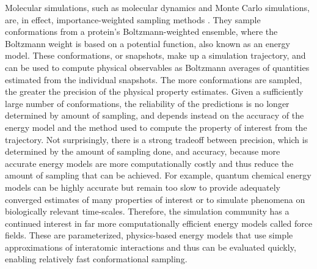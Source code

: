 \documentclass[9pt,review]{livecoms}
\begin{document}
Molecular simulations, such as molecular dynamics and Monte Carlo simulations, are, in effect, importance-weighted sampling methods \cite{frenkel_understanding_2001}.
They sample conformations from a protein’s Boltzmann-weighted ensemble, where the Boltzmann weight is based on a potential function, also known as an energy model.
These conformations, or snapshots, make up a simulation trajectory, and can be used to compute physical observables as Boltzmann averages of quantities estimated from the individual snapshots.
The more conformations are sampled, the greater the precision of the physical property estimates.
Given a sufficiently large number of conformations, the reliability of the predictions is no longer determined by amount of sampling, and depends instead on the accuracy of the energy model and the method used to compute the property of interest from the trajectory.
Not surprisingly, there is a strong tradeoff between precision, which is determined by the amount of sampling done, and accuracy, because more accurate energy models are more computationally costly and thus reduce the amount of sampling that can be achieved.
For example, quantum chemical energy models can be highly accurate but remain too slow to provide adequately converged estimates of many properties of interest or to simulate phenomena on biologically relevant time-scales.
Therefore, the simulation community has a continued interest in far more computationally efficient energy models called force fields.
These are parameterized, physics-based energy models that use simple approximations of interatomic interactions and thus can be evaluated quickly, enabling relatively fast conformational sampling.
\end{document}

